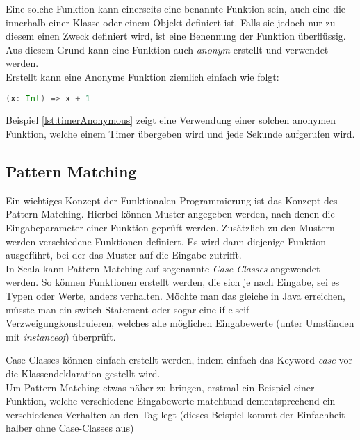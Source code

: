 Eine solche Funktion kann einerseits eine benannte Funktion sein,
auch eine die innerhalb einer Klasse oder einem Objekt definiert ist.
Falls sie jedoch nur zu diesem einen Zweck definiert wird, ist eine 
Benennung der Funktion überflüssig. Aus diesem Grund kann eine Funktion
auch \emph{anonym} erstellt und verwendet werden.\\

Erstellt kann eine Anonyme Funktion ziemlich einfach wie folgt:

\begin{lstlisting}[float=ht,language=scala,caption=Anonyme Funktion,label=lst:anonymousFunction]
(x: Int) => x + 1
\end{lstlisting}

Beispiel \ref{lst:timerAnonymous} zeigt eine Verwendung einer solchen 
anonymen Funktion, welche einem Timer übergeben wird und jede Sekunde
aufgerufen wird. \\

\subsection{Pattern Matching}

Ein wichtiges Konzept der Funktionalen Programmierung ist das Konzept
des Pattern Matching. Hierbei können Muster angegeben werden, nach denen 
die Eingabeparameter einer Funktion geprüft werden. Zusätzlich zu den
Mustern werden verschiedene Funktionen definiert. Es wird dann diejenige
Funktion ausgeführt, bei der das Muster auf die Eingabe zutrifft.\\

In Scala kann Pattern Matching auf sogenannte \emph{Case Classes} angewendet
werden. So können Funktionen erstellt werden, die sich je nach Eingabe,
sei es Typen oder Werte, anders verhalten.  Möchte man das gleiche
in Java erreichen, müsste man ein switch-Statement oder sogar eine
\glqq if-elseif-Verzweigung\grqq konstruieren, welches alle möglichen
Eingabewerte (unter Umständen mit \emph{instanceof}) überprüft.

Case-Classes können einfach erstellt werden, indem einfach das Keyword
\emph{case} vor die Klassendeklaration gestellt wird. \\

Um Pattern Matching etwas näher zu bringen, erstmal ein Beispiel einer
Funktion, welche verschiedene Eingabewerte \glqq matcht\grqq und dementsprechend
ein verschiedenes Verhalten an den Tag legt (dieses Beispiel kommt der 
Einfachheit halber ohne Case-Classes aus)

